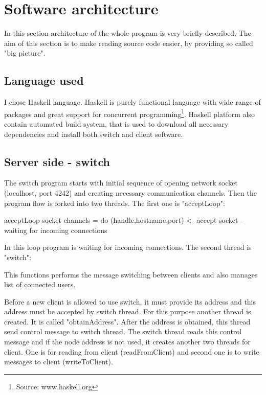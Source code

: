 \documentclass[11pt,a4paper,titlepage]{article}
\begin{document}
\section{Software architecture}

In this section architecture of the whole program is very briefly described. The aim of this section is to make reading source code easier, by providing so called "big picture".

\subsection{Language used}
I chose Haskell language. Haskell is purely functional language with wide range of packages and great support for concurrent programming\footnote{Source: www.haskell.org}. Haskell platform also contain automated build system, that is used to download all necessary dependencies and install both switch and client software.

\subsection{Server side - switch}

The switch program starts with initial sequence of opening network socket (localhost, port 4242) and creating necessary communication channels. Then the program flow is forked into two threads. The first one is "acceptLoop":
\begin{haskellcode}
acceptLoop socket channels = do
  (handle,hostname,port) <- accept socket --waiting for incoming connections
\end{haskellcode}
In this loop program is waiting for incoming connections. The second thread is "switch":
This functions performs the message switching between clients and also manages list of connected users.

Before a new client is allowed to use switch, it must provide its address and this address must be accepted by switch thread. For this purpose another thread is created. It is called "obtainAddress". After the address is obtained, this thread send control message to switch thread. The switch thread reads this control message and if the node address is not used, it creates another two threads for client. One is for reading from client (readFromClient) and second one is to write messages to client (writeToClient).
\end{document}
